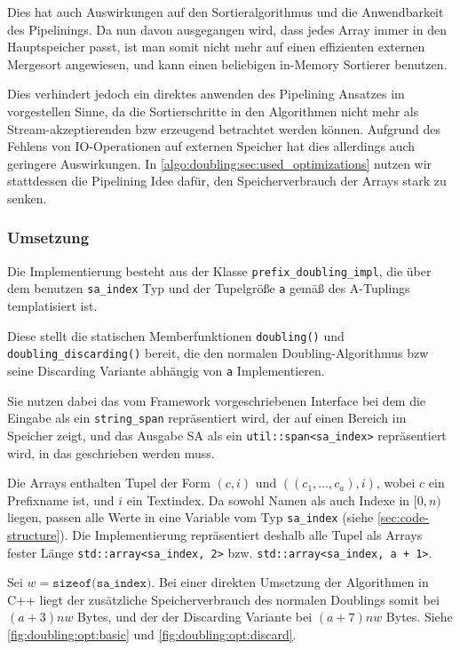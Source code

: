 Dies hat auch Auswirkungen auf den Sortieralgorithmus und die Anwendbarkeit des Pipelinings. Da nun davon ausgegangen wird, dass jedes Array immer in den Hauptspeicher passt, ist man somit nicht mehr auf einen effizienten externen Mergesort angewiesen, und kann einen beliebigen in-Memory Sortierer benutzen. 

Dies verhindert jedoch ein direktes anwenden des Pipelining Ansatzes im vorgestellen Sinne, da die Sortierschritte in den Algorithmen nicht mehr als Stream-akzeptierenden bzw erzeugend betrachtet werden können. Aufgrund des Fehlens von IO-Operationen auf externen Speicher hat dies allerdings auch geringere Auswirkungen. In \cref{algo:doubling:sec:used_optimizations} nutzen wir stattdessen die Pipelining Idee dafür, den Speicherverbrauch der Arrays stark zu senken.

\subsubsection{Umsetzung}

Die Implementierung besteht aus der Klasse \texttt{prefix\_doubling\_impl}, die über dem benutzen \texttt{sa\_index} Typ und der Tupelgröße \texttt{a} gemäß des A-Tuplings templatisiert ist.

Diese stellt die statischen Memberfunktionen \texttt{doubling()} und \texttt{doubling\_discarding()} bereit, die den normalen Doubling-Algorithmus bzw seine Discarding Variante abhängig von \texttt{a} Implementieren.

Sie nutzen dabei das vom Framework vorgeschriebenen Interface bei dem die Eingabe als ein \texttt{string\_span} repräsentiert wird, der auf einen Bereich im Speicher zeigt, und das Ausgabe SA als ein \texttt{util::span<sa\_index>} repräsentiert wird, in das geschrieben werden muss.

Die Arrays enthalten Tupel der Form  $(c, i)$ und $((c_1, \dots, c_a), i)$, wobei $c$ ein Prefixname ist, und $i$ ein Textindex. Da sowohl Namen als auch Indexe in $[0, n)$ liegen, passen alle Werte in eine Variable vom Typ \texttt{sa\_index} (siehe \cref{sec:code-structure}). Die Implementierung repräsentiert deshalb alle Tupel als Arrays fester Länge \texttt{std::array<sa\_index, 2>} bzw. \texttt{std::array<sa\_index, a + 1>}.

Sei $w = \texttt{sizeof(sa\_index)}$. Bei einer direkten Umsetzung der Algorithmen in C++ liegt der zusätzliche Speicherverbrauch des normalen Doublings somit bei $(a + 3)nw$ Bytes, und der der Discarding Variante bei $(a + 7)nw$ Bytes. Siehe \cref{fig:doubling:opt:basic} und \cref{fig:doubling:opt:discard}.

